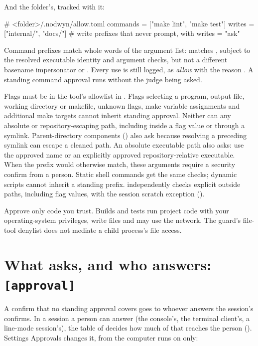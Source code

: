 And the folder's, tracked with it:

\begin{toml}
# <folder>/.nodwyn/allow.toml
commands = ["make lint", "make test"]
writes   = ["internal/", "docs/"]      # write prefixes that never prompt, with writes = "ask"
\end{toml}

Command prefixes match whole words of the argument list: 
matches , subject to the resolved executable identity and
argument checks, but not a different basename impersonator or .
Every use is still logged, as \emph{allow} with the reason
. A standing command approval runs
without the judge being asked.

Flags must be in the tool's allowlist in
. Flags selecting a program, output
file, working directory or makefile, unknown flags, make variable assignments
and additional make targets cannot inherit standing approval. Neither can any
absolute or repository-escaping path, including inside a flag value or through
a symlink. Parent-directory components () also ask because resolving a
preceding symlink can escape a cleaned path. An absolute executable path also
asks: use the approved name or
an explicitly approved repository-relative executable. When the prefix would
otherwise match, these arguments require a security confirm from a person.
Static shell commands get the same checks; dynamic scripts cannot inherit a
standing prefix.  independently checks explicit outside paths,
including flag values, with the session scratch exception ().

\begin{tip}
Approve only code you trust. Builds and tests run project code with your
operating-system privileges, write files and may use the network. The guard's
file-tool denylist does not mediate a child process's file access.
\end{tip}

\section{What asks, and who answers: \texttt{[approval]}}

A confirm that no standing approval covers goes to whoever answers the
session's confirms. In a session a person can answer (the console's, the
terminal client's, a line-mode session's), the \code{[approval]} table of
 decides how much of that reaches the person
(). Settings \textrightarrow{} Approvals changes it, from the
computer \nodwyn{} runs on only:

